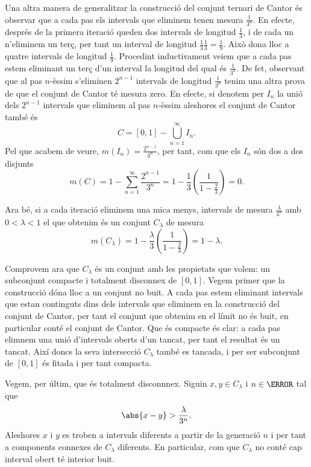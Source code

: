 \documentclass[12pt]{article}
\begin{document}
Una altra manera de generalitzar la construcció del conjunt ternari de Cantor és observar
que a cada pas els intervals que eliminem tenen mesura \( \frac{1}{3^n} \). En efecte,
després de la primera iteració queden dos intervals de longitud \( \frac{1}{3} \), i de
cada un n'eliminem un terç, per tant un interval de longitud \( \frac{1}{3}\frac{1}{3} =
\frac{1}{9} \). Això dona lloc a quatre intervals de longitud \( \frac{1}{9} \). Procedint
inductivament veiem que a cada pas estem eliminant un terç d'un interval la longitud del
qual és \( \frac{1}{3^n} \). De fet, observant que al pas \( n \)-èssim s'eliminen \(
2^{n-1} \) intervals de longitud \( \frac{1}{3^n} \) tenim una altra prova de que el
conjunt de Cantor té mesura zero. En efecte, si denotem per \( I_n \) la unió dels \(
2^{n-1} \) intervals que eliminem al pas \( n \)-èssim aleshores el conjunt de Cantor
també és
\begin{equation*}
	C = [0,1] - \bigcup_{n = 1}^{\infty} I_n.
\end{equation*}
Pel que acabem de veure, \( m(I_n) = \frac{2^{n-1}}{3^n} \), per tant, com que els \( I_n
\) són dos a dos disjunts
\begin{equation*}
	m(C) = 1 - \sum_{n = 1}^{\infty} \frac{2^{n-1}}{3^n} = 1 - \frac{1}{3}\left(\frac{1}{1 -
	\frac{2}{3}}\right) = 0. 
\end{equation*}

Ara bé, si a cada iteració eliminem una mica menys, intervals de mesura \(
\frac{\lambda}{3^n} \) amb \( 0 < \lambda < 1 \) el que obtenim és un conjunt \(
C_\lambda \) de mesura
\begin{equation*}
	m(C_\lambda) = 1 - \frac{\lambda}{3}\left(\frac{1}{1 - \frac{2}{3}}\right) = 1 -
	\lambda.
\end{equation*}

Comprovem ara que \( C_\lambda \) és un conjunt amb les propietats que volem: un
subconjunt compacte i totalment disconnex de \( [0,1] \). Vegem primer que la construcció
dóna lloc a un conjunt no buit. A cada pas estem eliminant intervals que estan continguts
dins dels intervals que eliminem en la construcció del conjunt de Cantor, per tant el
conjunt que obtenim en el límit no és buit, en particular conté el conjunt de Cantor. Que
és compacte és clar: a cada pas elimnem una unió d'intervals oberts d'un tancat, per tant
el resultat és un tancat. Així doncs la seva intersecció \( C_\lambda \) també es tancada,
i per ser subconjunt de \( [0,1] \) és fitada i per tant compacta. 

Vegem, per últim, que és totalment disconnnex. Siguin \( x, y \in C_\lambda \) i \( n \in
\N \) tal que 
\begin{equation*}
	\abs{x - y} > \frac{\lambda}{3^n}.
\end{equation*}
Aleshores \( x \) i \( y \) es troben a intervals diferents a partir de la generació \( n
\) i per tant a components connexes de \( C_\lambda \) diferents. En particular, com que
\( C_{\lambda} \) no conté cap interval obert té interior buit. 
\end{document}
